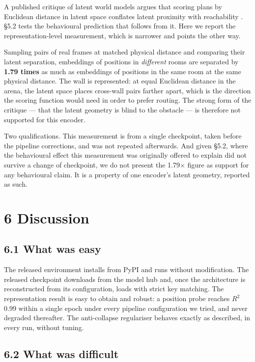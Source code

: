 \documentclass[10pt]{article}
\begin{document}
A published critique of latent world models argues that scoring plans by
Euclidean distance in latent space conflates latent proximity with reachability
\citep{li2026beyond}. \S{}5.2 tests the behavioural prediction that follows from it.
Here we report the representation-level measurement, which is narrower and
points the other way.

Sampling pairs of real frames at matched physical distance and comparing their
latent separation, embeddings of positions in \emph{different} rooms are separated by
\textbf{1.79 times} as much as embeddings of positions in the same room at the same
physical distance. The wall is represented: at equal Euclidean distance in the
arena, the latent space places cross-wall pairs farther apart, which is the
direction the scoring function would need in order to prefer routing. The strong
form of the critique --- that the latent geometry is blind to the obstacle --- is
therefore not supported for this encoder.

Two qualifications. This measurement is from a single checkpoint, taken before
the pipeline corrections, and was not repeated afterwards. And given \S{}5.2, where
the behavioural effect this measurement was originally offered to explain did
not survive a change of checkpoint, we do not present the 1.79$\times$ figure as
support for any behavioural claim. It is a property of one encoder's latent
geometry, reported as such.

\section{6 Discussion}\label{discussion}

\subsection{6.1 What was easy}\label{what-was-easy}

The released environment installs from PyPI and runs without modification. The
released checkpoint downloads from the model hub and, once the architecture is
reconstructed from its configuration, loads with strict key matching. The
representation result is easy to obtain and robust: a position probe reaches
$R^{2}$ 0.99 within a single epoch under every pipeline configuration we tried, and
never degraded thereafter. The anti-collapse regulariser behaves exactly as
described, in every run, without tuning.

\subsection{6.2 What was difficult}\label{what-was-difficult}
\end{document}
